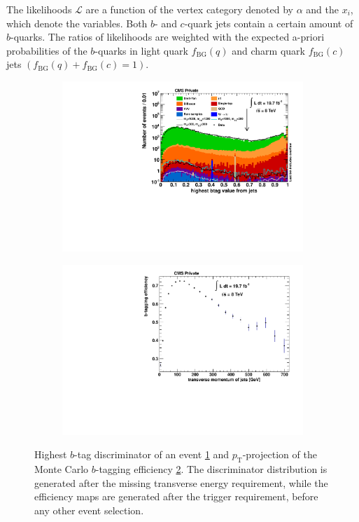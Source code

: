\noindent The likelihoods $\mathcal{L}$ are a function of the vertex category denoted by $\alpha$ and the $x_i$, which denote the variables. Both $b$- and $c$-quark jets contain a certain amount of $b$-quarks. The ratios of likelihoods are weighted with the expected a-priori probabilities of the $b$-quarks in light quark $f_{\text{BG}}(q)$ and charm quark $f_{\text{BG}}(c)$ jets $(f_{\text{BG}}(q) + f_{\text{BG}}(c) = 1)$.

\begin{figure}[htb!]
  \centering
  \begin{subfigure}[b]{0.495\textwidth}
    \centering
    \includegraphics[width=\textwidth]{plots/1st_btag.pdf}
    \caption{\label{fig:1st_btag}}
  \end{subfigure}
  \begin{subfigure}[b]{0.495\textwidth}
    \centering
    \includegraphics[width=\textwidth]{plots/b_proj.pdf}
    \caption{\label{fig:b_proj}}
  \end{subfigure}
  \caption{Highest $b$-tag discriminator of an event \ref{fig:1st_btag} and $p_{\text{T}}$-projection of the Monte Carlo $b$-tagging efficiency \ref{fig:b_proj}. The discriminator distribution is generated after the missing transverse energy requirement, while the efficiency maps are generated after the trigger requirement, before any other event selection.}
  \label{fig:btag}
\end{figure}

